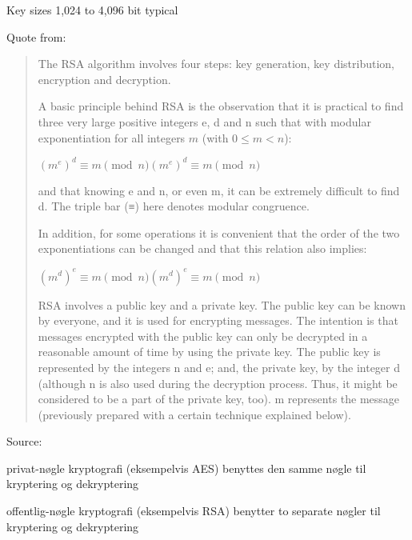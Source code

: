 \documentclass[Screen16to9,17pt]{foils}
\begin{document}
\begin{list2}
\item Key sizes	1,024 to 4,096 bit typical
\item  Quote from: 
\end{list2}



\begin{quote}\small
The RSA algorithm involves four steps: key generation, key distribution, encryption and decryption.

A basic principle behind RSA is the observation that it is practical to find three very large positive integers e, d and n such that with modular exponentiation for all integers $m$ (with $0 ≤ m < n$):

${\displaystyle (m^{e})^{d}\equiv m{\pmod {n}}} {\displaystyle (m^{e})^{d}\equiv m{\pmod {n}}}$

and that knowing e and n, or even m, it can be extremely difficult to find d. The triple bar (≡) here denotes modular congruence.

In addition, for some operations it is convenient that the order of the two exponentiations can be changed and that this relation also implies:

${\displaystyle (m^{d})^{e}\equiv m{\pmod {n}}} {\displaystyle (m^{d})^{e}\equiv m{\pmod {n}}}$

RSA involves a public key and a private key. The public key can be known by everyone, and it is used for encrypting messages. The intention is that messages encrypted with the public key can only be decrypted in a reasonable amount of time by using the private key. The public key is represented by the integers n and e; and, the private key, by the integer d (although n is also used during the decryption process. Thus, it might be considered to be a part of the private key, too). m represents the message (previously prepared with a certain technique explained below).
\end{quote}

Source: 




\begin{list1}
\item privat-nøgle kryptografi (eksempelvis AES) benyttes den samme
  nøgle til kryptering og dekryptering
\item offentlig-nøgle kryptografi (eksempelvis RSA) benytter to
  separate nøgler til kryptering og dekryptering
\end{list1}
\end{document}
